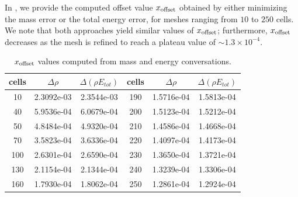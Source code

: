 \documentclass[times,doublespace]{fldauth}%
\begin{document}
In , we provide the computed offset value $x_{\text{\text{offset}}}$ obtained by either minimizing the mass error
or the total energy error, for meshes ranging from $10$ to $250$ cells.
We note that both approaches yield similar values of $x_{\text{\text{offset}}}$; furthermore, $x_{\text{\text{offset}}}$ decreases as the mesh is refined to reach a plateau value of $\sim 1.3 \times 10^{-4}$.
%
\begin{table}[h]
\begin{center}
\begin{tabular}{ |c|c|c||c|c|c| }
\hline
 cells & $\Delta \rho$ & $\Delta (\rho E_{tot})$ &  cells & $\Delta \rho$ & $\Delta (\rho E_{tot})$ \\ \hline
10 & 2.3092e-03 & 2.3544e-03 & 190 & 1.5716e-04 & 1.5813e-04 \\ \hline
40 & 5.9536e-04 & 6.0679e-04 & 200 & 1.5123e-04 & 1.5212e-04 \\ \hline
50 & 4.8484e-04 & 4.9320e-04 & 210 & 1.4586e-04 & 1.4668e-04 \\ \hline
70 & 3.5823e-04 & 3.6336e-04 & 220 & 1.4097e-04 & 1.4173e-04 \\ \hline
100 & 2.6301e-04 & 2.6590e-04 & 230 & 1.3650e-04 & 1.3721e-04 \\ \hline
130 & 2.1154e-04 & 2.1344e-04 & 240 & 1.3239e-04 & 1.3306e-04 \\ \hline
160 & 1.7930e-04 & 1.8062e-04 & 250 & 1.2861e-04 & 1.2924e-04 \\ \hline
\end{tabular}
\end{center}
\caption{$x_{\text{\text{offset}}}$ values computed from mass and energy conversations.}\label{tbl:mach-1p05-x-offset}
\end{table}
\end{document}
